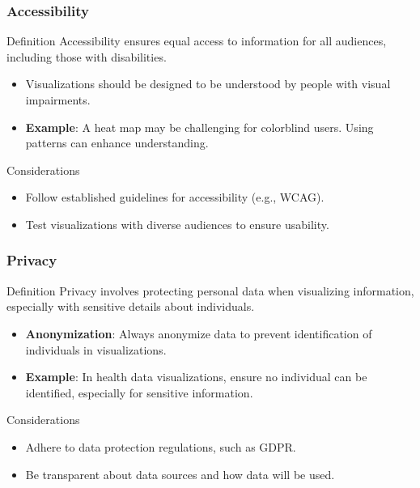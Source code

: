\documentclass[aspectratio=169]{beamer}
\begin{document}
\begin{frame}[fragile]
    \frametitle{Accessibility}
    
    \begin{block}{Definition}
        Accessibility ensures equal access to information for all audiences, including those with disabilities.
    \end{block}
    
    \begin{itemize}
        \item Visualizations should be designed to be understood by people with visual impairments.
        \item \textbf{Example}: A heat map may be challenging for colorblind users. Using patterns can enhance understanding.
    \end{itemize}
    
    \begin{block}{Considerations}
        \begin{itemize}
            \item Follow established guidelines for accessibility (e.g., WCAG).
            \item Test visualizations with diverse audiences to ensure usability.
        \end{itemize}
    \end{block}
\end{frame}

\begin{frame}[fragile]
    \frametitle{Privacy}
    
    \begin{block}{Definition}
        Privacy involves protecting personal data when visualizing information, especially with sensitive details about individuals.
    \end{block}
    
    \begin{itemize}
        \item \textbf{Anonymization}: Always anonymize data to prevent identification of individuals in visualizations.
        \item \textbf{Example}: In health data visualizations, ensure no individual can be identified, especially for sensitive information.
    \end{itemize}
    
    \begin{block}{Considerations}
        \begin{itemize}
            \item Adhere to data protection regulations, such as GDPR.
            \item Be transparent about data sources and how data will be used.
        \end{itemize}
    \end{block}
\end{frame}
\end{document}
